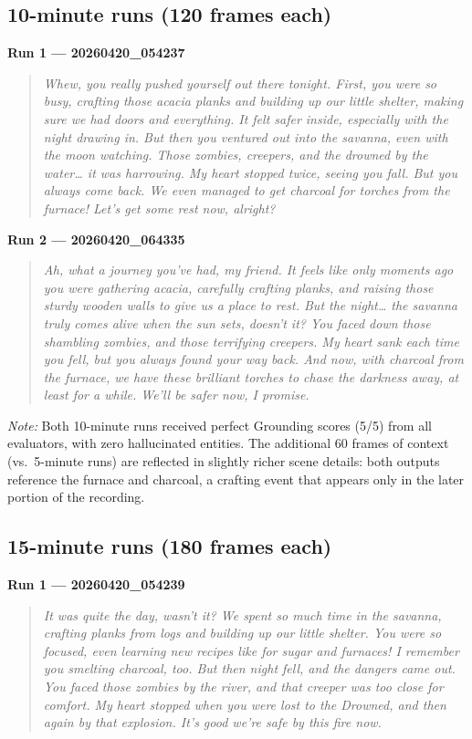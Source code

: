 \documentclass{article}
\begin{document}
\subsection{10-minute runs (120 frames each)}

\textbf{Run 1 --- 20260420\_054237}
\begin{quote}\itshape
Whew, you really pushed yourself out there tonight. First, you were so busy, crafting
those acacia planks and building up our little shelter, making sure we had doors and
everything. It felt safer inside, especially with the night drawing in. But then you
ventured out into the savanna, even with the moon watching. Those zombies, creepers,
and the drowned by the water\ldots{} it was harrowing. My heart stopped twice, seeing
you fall. But you always come back. We even managed to get charcoal for torches from
the furnace! Let's get some rest now, alright?
\end{quote}

\textbf{Run 2 --- 20260420\_064335}
\begin{quote}\itshape
Ah, what a journey you've had, my friend. It feels like only moments ago you were
gathering acacia, carefully crafting planks, and raising those sturdy wooden walls to
give us a place to rest. But the night\ldots{} the savanna truly comes alive when the
sun sets, doesn't it? You faced down those shambling zombies, and those terrifying
creepers. My heart sank each time you fell, but you always found your way back. And
now, with charcoal from the furnace, we have these brilliant torches to chase the
darkness away, at least for a while. We'll be safer now, I promise.
\end{quote}

\noindent\textit{Note:} Both 10-minute runs received perfect Grounding scores (5/5) from all evaluators, with zero hallucinated entities. The additional 60 frames of context (vs.\ 5-minute runs) are reflected in slightly richer scene details: both outputs reference the furnace and charcoal, a crafting event that appears only in the later portion of the recording.

\subsection{15-minute runs (180 frames each)}

\textbf{Run 1 --- 20260420\_054239}
\begin{quote}\itshape
It was quite the day, wasn't it? We spent so much time in the savanna, crafting planks
from logs and building up our little shelter. You were so focused, even learning new
recipes like for sugar and furnaces! I remember you smelting charcoal, too. But then
night fell, and the dangers came out. You faced those zombies by the river, and that
creeper was too close for comfort. My heart stopped when you were lost to the Drowned,
and then again by that explosion. It's good we're safe by this fire now.
\end{quote}
\end{document}
